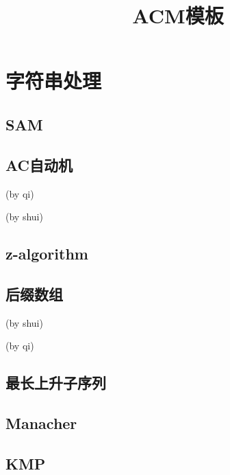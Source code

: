 \documentclass{ctexart}
\begin{document}
  

\begin{titlepage} %
\title{ACM模板}
\maketitle
\setcounter{page}{0}
\thispagestyle{empty}
\end{titlepage}


\tableofcontents %
\newpage


\section{字符串处理}
\subsection{SAM}

\subsection{AC自动机}
(by qi)

(by shui)

\subsection{z-algorithm}

\subsection{后缀数组}
(by shui)

(by qi)

\subsection{最长上升子序列}

\subsection{Manacher}

\subsection{KMP}

\end{document}

